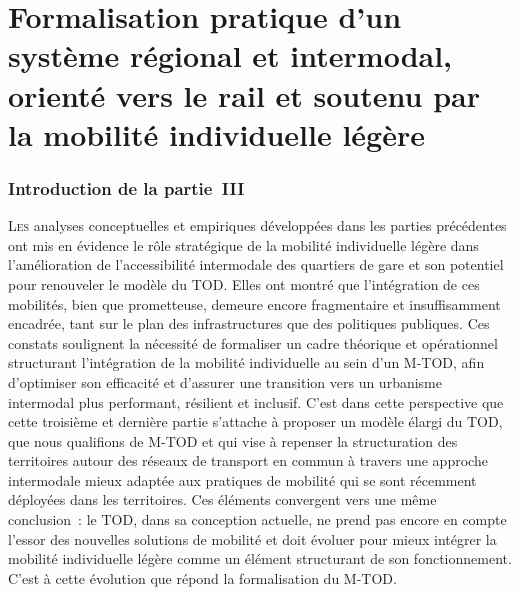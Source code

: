 \part{Formalisation pratique d'un système régional et intermodal, orienté vers le rail et soutenu par la mobilité individuelle légère
    \label{part3:titre}
    }

\cleardoublepage
\section*{Introduction de la partie~III
    \label{part3:introduction}
    }

\lettrine[lines=3, findent=8pt, nindent=0pt]{ L}{es} analyses conceptuelles et empiriques développées dans les parties précédentes ont mis en évidence le rôle stratégique de la mobilité individuelle légère dans l’amélioration de l’accessibilité intermodale des quartiers de gare et son potentiel pour renouveler le modèle du \acrshort{TOD}. Elles ont montré que l’intégration de ces mobilités, bien que prometteuse, demeure encore fragmentaire et insuffisamment encadrée, tant sur le plan des infrastructures que des politiques publiques. Ces constats soulignent la nécessité de formaliser un cadre théorique et opérationnel structurant l’intégration de la mobilité individuelle au sein d'un \acrshort{M-TOD}, afin d’optimiser son efficacité et d’assurer une transition vers un urbanisme intermodal plus performant, résilient et inclusif. C’est dans cette perspective que cette troisième et dernière partie s’attache à proposer un modèle élargi du \acrshort{TOD}, que nous qualifions de \acrfull{M-TOD} et qui vise à repenser la structuration des territoires autour des réseaux de transport en commun à travers une approche intermodale mieux adaptée aux pratiques de mobilité qui se sont récemment déployées dans les territoires. Ces éléments convergent vers une même conclusion~: le \acrshort{TOD}, dans sa conception actuelle, ne prend pas encore en compte l’essor des nouvelles solutions de mobilité et doit évoluer pour mieux intégrer la mobilité individuelle légère comme un élément structurant de son fonctionnement. C’est à cette évolution que répond la formalisation du \acrshort{M-TOD}.

